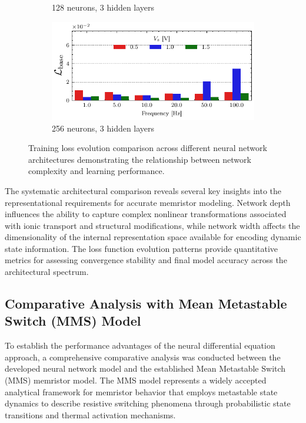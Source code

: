 \documentclass[11pt, oneside]{article}
\begin{document}
\begin{figure}
\begin{subfigure}[c]{0.48\linewidth}
        \caption{128 neurons, 3 hidden layers}
    \end{subfigure}
    \hfill
    \begin{subfigure}[c]{0.48\linewidth}
        \centering
        \includegraphics[width=\linewidth]{sample_results/loss_per_freq_model_silu_256_3_cpu.pdf}
        \caption{256 neurons, 3 hidden layers}
    \end{subfigure}
    \caption{Training loss evolution comparison across different neural network architectures demonstrating the relationship between network complexity and learning performance. }
    \label{fig:loss_per_freq}
\end{figure}

The systematic architectural comparison reveals several key insights into the representational requirements for accurate memristor modeling. Network depth influences the ability to capture complex nonlinear transformations associated with ionic transport and structural modifications, while network width affects the dimensionality of the internal representation space available for encoding dynamic state information. The loss function evolution patterns provide quantitative metrics for assessing convergence stability and final model accuracy across the architectural spectrum.

\clearpage

\subsection{Comparative Analysis with Mean Metastable Switch (MMS) Model}

To establish the performance advantages of the neural differential equation approach, a comprehensive comparative analysis was conducted between the developed neural network model and the established Mean Metastable Switch (MMS) memristor model. The MMS model represents a widely accepted analytical framework for memristor behavior that employs metastable state dynamics to describe resistive switching phenomena through probabilistic state transitions and thermal activation mechanisms.
\end{document}
